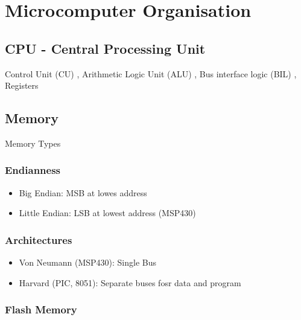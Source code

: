 \section{Microcomputer Organisation }
\subsection{CPU - Central Processing Unit }
Control Unit (CU) , 
Arithmetic Logic Unit (ALU) , 
Bus interface logic (BIL) ,
Registers 
\subsection{Memory}
Memory Types 

\subsubsection{Endianness}
\begin{itemize}
	\itemsep-.5em 
	\item Big Endian: MSB at lowes address
	\item Little Endian: LSB at lowest address (MSP430)
\end{itemize}

\subsubsection{Architectures }
\begin{itemize}
	\itemsep-.5em 
	\item Von Neumann (MSP430): Single Bus
	\item Harvard (PIC, 8051): Separate buses fosr data and program
\end{itemize}

\subsubsection{Flash Memory }

